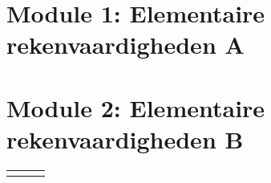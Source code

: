 \documentclass[11pt]{article}
\begin{document}
\section{Module 1: Elementaire rekenvaardigheden A}
%
%
%

%
%
%

%
\section{Module 2: Elementaire rekenvaardigheden B}
%
%



\begin{tabular}{ccc}
	& &    \\
\end{tabular}

%

%
%

%
%

%
%
%
%
%
%
\end{document}

